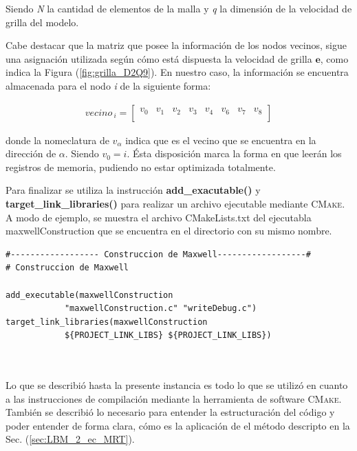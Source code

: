 Siendo \textit{N} la cantidad de elementos de la malla y \textit{q} la dimensión de la velocidad de grilla del modelo.

Cabe destacar que la matriz que posee la información de los nodos vecinos, sigue una asignación utilizada según cómo está dispuesta la velocidad de grilla $\mathbf{e}$, como indica la Figura (\ref{fig:grilla_D2Q9}). En nuestro caso, la información se encuentra almacenada para el nodo \textit{i} de la siguiente forma:

\begin{align*}
	vecino_{\>i} =
	\begin{bmatrix}
	v_0 & v_1 & v_2 & v_3 & v_4 & v_6 & v_7 & v_8 \\
	\end{bmatrix}
\end{align*}

donde la nomeclatura de $v_\alpha$ indica que es el vecino que se encuentra en la dirección de $\alpha$. Siendo $v_0 = i$. Ésta disposición marca la forma en que leerán los registros de memoria, pudiendo no estar optimizada totalmente.

Para finalizar se utiliza la instrucción \textbf{add\_exacutable()} y \textbf{target\_link\_libraries()} para realizar un archivo ejecutable mediante \textsc{CMake}. A modo de ejemplo, se muestra el archivo CMakeLists.txt del ejecutabla maxwellConstruction que se encuentra en el directorio con su mismo nombre.

{\footnotesize
	\begin{frame}{}
		\begin{lstlisting}[frame=single]
#------------------ Construccion de Maxwell------------------#
# Construccion de Maxwell

add_executable(maxwellConstruction 
			"maxwellConstruction.c" "writeDebug.c")
target_link_libraries(maxwellConstruction 
			${PROJECT_LINK_LIBS} ${PROJECT_LINK_LIBS})

		
		\end{lstlisting}
		
	\end{frame}
}


Lo que se describió hasta la presente instancia es todo lo que se utilizó en cuanto a las instrucciones de compilación mediante la herramienta de software \textsc{CMake}. También se describió lo necesario para entender la estructuración del código y poder entender de forma clara, cómo es la aplicación de el método descripto en la Sec. (\ref{sec:LBM_2_ec_MRT}).

